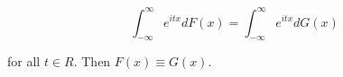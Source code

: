 $$\int_{-\infty}^{\infty} e^{itx} dF(x) = \int_{-\infty}^{\infty} e^{itx} dG(x)$$

for all $t \in R$. Then $F(x) \equiv G(x)$.
